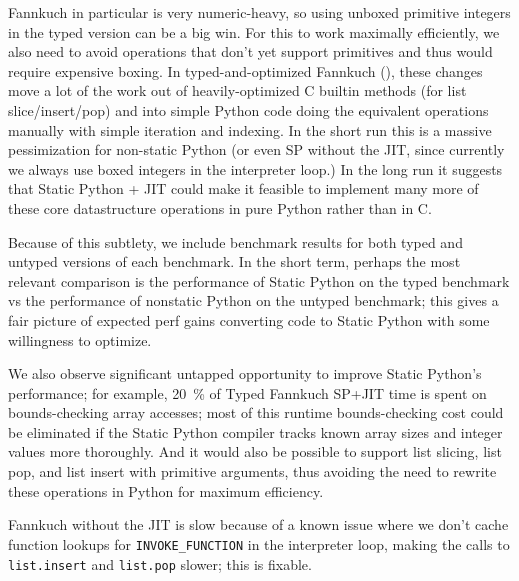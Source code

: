\documentclass[english,cleveref,crc]{programming}
\newcommand{\code}[1]{\texttt{#1}}
\begin{document}
Fannkuch in particular is very numeric-heavy, so using unboxed primitive
integers in the typed version can be a big win. For this to work maximally
efficiently, we also need to avoid operations that don't yet support primitives
and thus would require expensive boxing. In typed-and-optimized Fannkuch (), these changes move
a lot of the work out of heavily-optimized C builtin methods (for list
slice/insert/pop) and into simple Python code doing the equivalent operations
manually with simple iteration and indexing. In the short run this is a massive
pessimization for non-static Python (or even SP without the JIT, since
currently we always use boxed integers in the interpreter loop.) In the long
run it suggests that Static Python + JIT could make it feasible to implement
many more of these core datastructure operations in pure Python rather than in
C.

Because of this subtlety, we include benchmark results for both typed and
untyped versions of each benchmark. In the short term, perhaps the most
relevant comparison is the performance of Static Python on the typed benchmark
vs the performance of nonstatic Python on the untyped benchmark; this gives a
fair picture of expected perf gains converting code to Static Python with some
willingness to optimize.

We also observe significant untapped opportunity to improve Static Python's
performance; for example, \SI{20}{\percent} of Typed Fannkuch SP+JIT time is spent on
bounds-checking array accesses; most of this runtime bounds-checking cost could
be eliminated if the Static Python compiler tracks known array sizes and
integer values more thoroughly. And it would also be possible to support list
slicing, list pop, and list insert with primitive arguments, thus avoiding the
need to rewrite these operations in Python for maximum efficiency.

 Fannkuch without the JIT is slow because of a known issue where we
don't cache function lookups for \code{INVOKE\_FUNCTION} in the interpreter loop,
making the calls to \code{list.insert} and \code{list.pop} slower; this is fixable.

\end{document}
